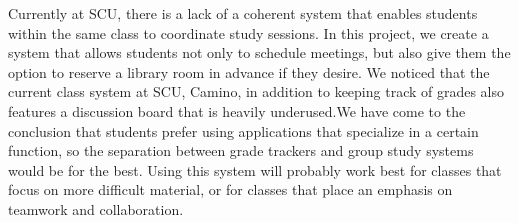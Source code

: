 Currently at SCU, there is a lack of a coherent system that enables students within the same class to coordinate study sessions. In this project, we create a system that allows students not only to schedule meetings, but also give them the option to reserve a library room in advance if they desire. We noticed that the current class system at SCU, Camino, in addition to keeping track of grades also features a discussion board that is heavily underused.We have come to the conclusion that students prefer using applications that specialize in a certain function, so the separation between grade trackers and group study systems would be for the best. Using this system will probably work best for classes that focus on more difficult material, or for classes that place an emphasis on teamwork and collaboration. 